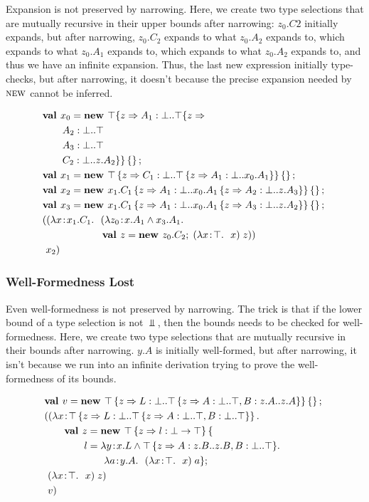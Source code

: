 \documentclass[preprint]{sigplanconf}
\begin{document}
Expansion is not preserved by narrowing. Here, we create two type
selections that are mutually recursive in their upper bounds after
narrowing: $z_0.C2$ initially expands, but after narrowing, $z_0.C_2$
expands to what $z_0.A_2$ expands to, which expands to what $z_0.A_1$
expands to, which expands to what $z_0.A_2$ expands to, and thus we
have an infinite expansion. Thus, the last new expression initially
type-checks, but after narrowing, it doesn't because the precise
expansion needed by $\textsc{new}$ cannot be inferred.

\begin{align*}
&\mlnew {x_0} {\Top \mlrefine z { \Ldecl {A_1} \Bot {\Top \mlrefine z {\\
&\gap\Ldecl {A_2} \Bot \Top\\
&\gap\Ldecl {A_3} \Bot \Top\\
&\gap\Ldecl {C_2} \Bot {z.A_2}}}}\ldefs{}}{
\mlnew {x_1} {\Top \refine z {\Ldecl {C_1} \Bot {\Top \refine z {\Ldecl {A_1} \Bot {x_0.A_1}}}}\ldefs{}}}{
\mlnew {x_2} {{x_1.C_1} \refine z {\Ldecl {A_1} \Bot {{x_0.A_1} \refine z {\Ldecl {A_2} \Bot {z.A_3}}}}\ldefs{}}}{
\mlnew {x_3} {{x_1.C_1} \refine z {\Ldecl {A_1} \Bot {{x_0.A_1} \refine z {\Ldecl {A_3} \Bot {z.A_2}}}}\ldefs{}}}{
\mlapp {\abs x {x_1.C_1} {(\abs {z_0} {x.A_1 \tand x_3.A_1} {\\&\gap\gap\gap\new z {z_0.C_2} {\app {(\abs x \Top x)} z}})}} {\ x_2}}
\end{align*}

\subsubsection{Well-Formedness Lost}\label{narrowing_wf}

Even well-formedness is not preserved by narrowing. The trick is that
if the lower bound of a type selection is not $\Bot$, then the
bounds needs to be checked for well-formedness. Here, we create two
type selections that are mutually recursive in their bounds
after narrowing. $y.A$ is initially well-formed, but after narrowing,
it isn't because we run into an infinite derivation trying to prove
the well-formedness of its bounds.

\begin{align*}
&\mlnew v {\Top \refine z {\Ldecl L \Bot {\Top \refine z {\Ldecl A \Bot \Top, \Ldecl B {z.A} {z.A}}}} \ldefs{}}{
\mlapp {\abs x {\Top \refine z {\Ldecl L \Bot {\Top \refine z {\Ldecl A \Bot \Top, \Ldecl B \Bot \Top}}}} {\\&\gap
\mlnew z {\Top \refine z {\ldecl l {\Bot \tfun \Top}}\mlldefs{\\&\gap\gap l = \abs y {x.L \tand {\Top \refine z {\Ldecl A {z.B} {z.B}, \Ldecl B \Bot \Top}}} {\\&\gap\gap\gap\abs a {y.A} {\app {(\abs x \Top x)} a}}}}{
\ \app {(\abs x \Top x)} z
}}}{\ v}}
\end{align*}
\end{document}
